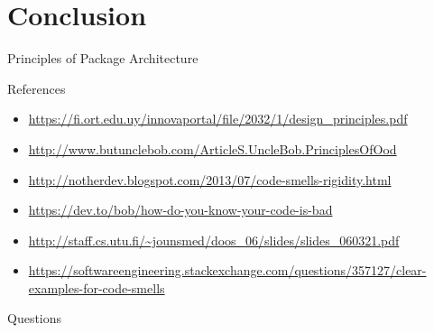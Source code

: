 \documentclass[xcolor=svgnames]{beamer}
\begin{document}

\section{Conclusion}


\begin{frame}{Principles of Package Architecture}
\end{frame}


\begin{frame}{References}
    \begin{itemize}
        \item \url{https://fi.ort.edu.uy/innovaportal/file/2032/1/design_principles.pdf}
        \item \url{http://www.butunclebob.com/ArticleS.UncleBob.PrinciplesOfOod}
        \item \url{http://notherdev.blogspot.com/2013/07/code-smells-rigidity.html}
        \item \url{https://dev.to/bob/how-do-you-know-your-code-is-bad}
        \item \url{http://staff.cs.utu.fi/~jounsmed/doos_06/slides/slides_060321.pdf}
        \item \url{https://softwareengineering.stackexchange.com/questions/357127/clear-examples-for-code-smells}
    \end{itemize}
\end{frame}


\begin{frame}{Questions}
\end{frame}
\end{document}

